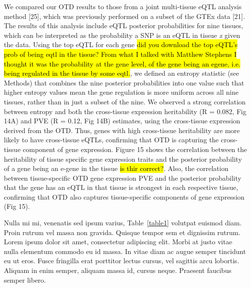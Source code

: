 \documentclass[10pt,letterpaper]{article}
\begin{document}
We compared our OTD results to those from a joint multi-tissue eQTL
analysis method {[}25{]}, which was previously performed on a subset of
the GTEx data {[}21{]}. The results of this analysis include eQTL
posterior probabilities for nine tissues, which can be
interpreted as the probability a SNP is an eQTL in tissue \emph{x} given
the data. Using the top eQTL for each gene \hl{did you download the top eQTL's prob of being eqtl in the tissue? From what I talked with Matthew Stephens I thought it was the probability at the gene level, of the gene being an egene, i.e. being regulated in the tissue by some eqtl.}, we defined an entropy
statistic (see Methods) that combines the nine posterior probabilities
into one value such that higher entropy values mean the 
gene regulation is more uniform across all nine tissues, rather
than in just a subset of the nine. We observed a strong correlation
between entropy and both the cross-tissue expression heritability (R =
0.082, Fig 14A) and PVE (R = 0.12, Fig 14B) estimates, using the
cross-tissue expression derived from the OTD. Thus, genes with high
cross-tissue heritability are more likely to have cross-tissue eQTLs,
confirming that OTD is capturing the cross-tissue component of gene
expression. Figure 15 shows the correlation between the heritability of tissue specific gene expression traits and the posterior probability of a gene being an e-gene in the tissue \hl{is thir correct?}. Also, the correlation between tissue-specific OTD gene
expression PVE and the posterior probability that the gene has an eQTL
in that tissue is strongest in each respective tissue, confirming that
OTD also captures tissue-specific components of gene expression (Fig
15).



Nulla mi mi, venenatis sed ipsum varius, Table~\ref{table1} volutpat euismod diam. Proin rutrum vel massa non gravida. Quisque tempor sem et dignissim rutrum. Lorem ipsum dolor sit amet, consectetur adipiscing elit. Morbi at justo vitae nulla elementum commodo eu id massa. In vitae diam ac augue semper tincidunt eu ut eros. Fusce fringilla erat porttitor lectus cursus, vel sagittis arcu lobortis. Aliquam in enim semper, aliquam massa id, cursus neque. Praesent faucibus semper libero.
\end{document}
